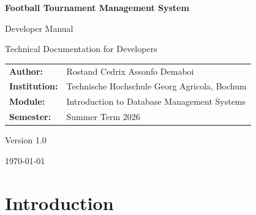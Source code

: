 \documentclass[12pt,a4paper]{article}
\begin{document}

\begin{titlepage}
\thispagestyle{fancy}
\centering

\vspace*{2cm}

{\Huge \textbf{Football Tournament Management System}\par}

\vspace{1cm}

{\LARGE Developer Manual\par}

\vspace{2cm}

{\large
Technical Documentation for Developers
\par}

\vspace{1.5cm}

\begin{tabular}{ll}
\textbf{Author:} & Rostand Cedrix Assonfo Demaboi \\
\textbf{Institution:} & Technische Hochschule Georg Agricola, Bochum \\
\textbf{Module:} & Introduction to Database Management Systems \\
\textbf{Semester:} & Summer Term 2026 \\
\end{tabular}

\vfill

{\large Version 1.0}

\vspace{0.5cm}

{\large \today}

\end{titlepage}


\tableofcontents
\newpage


\section{Introduction}
\end{document}
